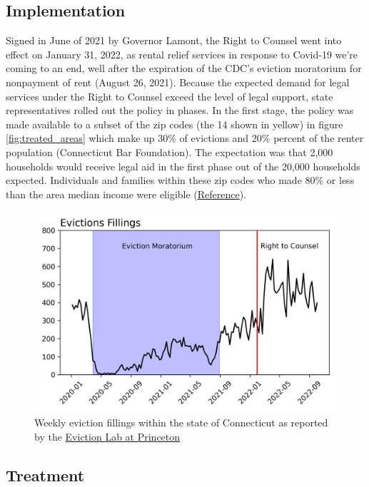 \documentclass[a4paper,12pt]{article}
\begin{document}
\subsection{Implementation}
Signed in June of 2021 by Governor Lamont, the Right to Counsel went into effect on January 31, 2022, as rental relief services in response to Covid-19 we're coming to an end, well after the expiration of the CDC's eviction moratorium for nonpayment of rent (August 26, 2021). Because the expected demand for legal services under the Right to Counsel exceed the level of legal support, state representatives rolled out the policy in phases.  In the first stage, the policy was made available to a subset of the zip codes (the 14 shown in yellow) in figure \ref{fig:treated_areas} which make up $30\%$ of evictions and $20\%$ percent of the renter population (Connecticut Bar Foundation). The expectation was that 2,000 households would receive legal aid in the first phase out of the 20,000 households expected. Individuals and families within these zip codes who made $80\%$ or less than the area median income were eligible (\href{https://www.cga.ct.gov/2021/ACT/PA/PDF/2021PA-00034-R00HB-06531-PA.PDF}{Reference}).
\par 
\begin{figure}[htbp]
\centering
    \centering
    \includegraphics[width=.60\linewidth]{figures/rtc/context/evictions_conn.png}
    \caption{Weekly eviction fillings within the state of Connecticut as reported by the \href{https://evictionlab.org/}{Eviction Lab at Princeton}}
    \label{SUBFIGURE LABEL 3}
\end{figure}
\subsection{Treatment}
\end{document}
